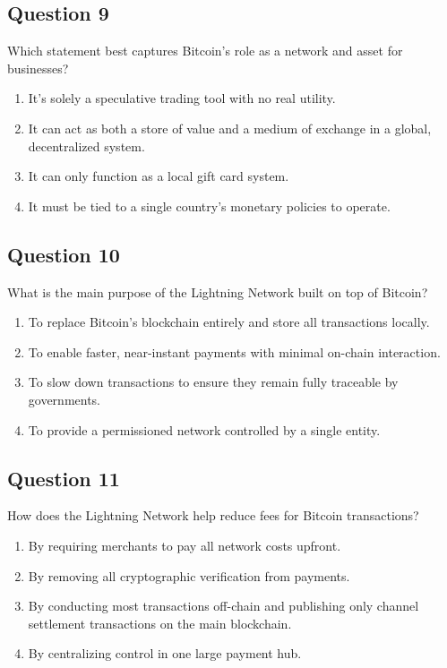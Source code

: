 \documentclass[12pt,a4paper]{article}
\begin{document}
\bigskip


\subsection*{Question 9}
Which statement best captures Bitcoin's role as a network and asset for businesses?

\begin{enumerate}[label=\Alph*., leftmargin=*]
\item It's solely a speculative trading tool with no real utility.
\item It can act as both a store of value and a medium of exchange in a global, decentralized system.
\item It can only function as a local gift card system.
\item It must be tied to a single country's monetary policies to operate.
\end{enumerate}

\bigskip


\subsection*{Question 10}
What is the main purpose of the Lightning Network built on top of Bitcoin?

\begin{enumerate}[label=\Alph*., leftmargin=*]
\item To replace Bitcoin’s blockchain entirely and store all transactions locally.
\item To enable faster, near-instant payments with minimal on-chain interaction.
\item To slow down transactions to ensure they remain fully traceable by governments.
\item To provide a permissioned network controlled by a single entity.
\end{enumerate}

\bigskip


\subsection*{Question 11}
How does the Lightning Network help reduce fees for Bitcoin transactions?

\begin{enumerate}[label=\Alph*., leftmargin=*]
\item By requiring merchants to pay all network costs upfront.
\item By removing all cryptographic verification from payments.
\item By conducting most transactions off-chain and publishing only channel settlement transactions on the main blockchain.
\item By centralizing control in one large payment hub.
\end{enumerate}
\end{document}
